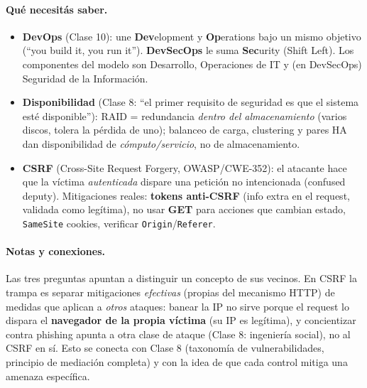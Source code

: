 \paragraph{Qué necesitás saber.}
\begin{itemize}
  \item \textbf{DevOps} (Clase 10): une \textbf{Dev}elopment y \textbf{Op}erations bajo un mismo objetivo (``you build it, you run it''). \textbf{DevSecOps} le suma \textbf{Sec}urity (Shift Left). Los componentes del modelo son Desarrollo, Operaciones de IT y (en DevSecOps) Seguridad de la Información.
  \item \textbf{Disponibilidad} (Clase 8: ``el primer requisito de seguridad es que el sistema esté disponible''): RAID = redundancia \emph{dentro del almacenamiento} (varios discos, tolera la pérdida de uno); balanceo de carga, clustering y pares HA dan disponibilidad de \emph{cómputo/servicio}, no de almacenamiento.
  \item \textbf{CSRF} (Cross-Site Request Forgery, OWASP/CWE-352): el atacante hace que la víctima \emph{autenticada} dispare una petición no intencionada (confused deputy). Mitigaciones reales: \textbf{tokens anti-CSRF} (info extra en el request, validada como legítima), no usar \textbf{GET} para acciones que cambian estado, \texttt{SameSite} cookies, verificar \texttt{Origin}/\texttt{Referer}.
\end{itemize}

\paragraph{Notas y conexiones.}
Las tres preguntas apuntan a distinguir un concepto de sus vecinos. En CSRF la trampa es separar mitigaciones \emph{efectivas} (propias del mecanismo HTTP) de medidas que aplican a \emph{otros} ataques: banear la IP no sirve porque el request lo dispara el \textbf{navegador de la propia víctima} (su IP es legítima), y concientizar contra phishing apunta a otra clase de ataque (Clase 8: ingeniería social), no al CSRF en sí. Esto se conecta con Clase 8 (taxonomía de vulnerabilidades, principio de mediación completa) y con la idea de que cada control mitiga una amenaza específica.

